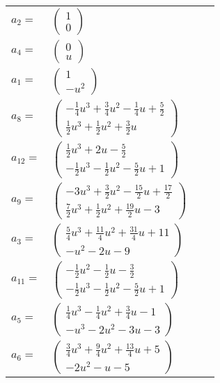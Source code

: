 \documentclass[1p]{elsarticle_modified}
\theoremstyle{definition}
\begin{document}
\begin{tabular}{m{7pt} m{180pt} m{7pt} m{180pt} }
\flushright $a_{2}=$&$\begin{pmatrix}1\\0\end{pmatrix}$ \\
\flushright $a_{4}=$&$\begin{pmatrix}0\\u\end{pmatrix}$ \\
\flushright $a_{1}=$&$\begin{pmatrix}1\\- u^2\end{pmatrix}$ \\
\flushright $a_{8}=$&$\begin{pmatrix}-\frac{1}{4} u^3+\frac{3}{4} u^2-\frac{1}{4} u+\frac{5}{2}\\\frac{1}{2} u^3+\frac{1}{2} u^2+\frac{3}{2} u\end{pmatrix}$ \\
\flushright $a_{12}=$&$\begin{pmatrix}\frac{1}{2} u^3+2 u-\frac{5}{2}\\-\frac{1}{2} u^3-\frac{1}{2} u^2-\frac{5}{2} u+1\end{pmatrix}$ \\
\flushright $a_{9}=$&$\begin{pmatrix}-3 u^3+\frac{3}{2} u^2-\frac{15}{2} u+\frac{17}{2}\\\frac{7}{2} u^3+\frac{1}{2} u^2+\frac{19}{2} u-3\end{pmatrix}$ \\
\flushright $a_{3}=$&$\begin{pmatrix}\frac{5}{4} u^3+\frac{11}{4} u^2+\frac{31}{4} u+11\\- u^2-2 u-9\end{pmatrix}$ \\
\flushright $a_{11}=$&$\begin{pmatrix}-\frac{1}{2} u^2-\frac{1}{2} u-\frac{3}{2}\\-\frac{1}{2} u^3-\frac{1}{2} u^2-\frac{5}{2} u+1\end{pmatrix}$ \\
\flushright $a_{5}=$&$\begin{pmatrix}\frac{1}{4} u^3-\frac{1}{4} u^2+\frac{3}{4} u-1\\- u^3-2 u^2-3 u-3\end{pmatrix}$ \\
\flushright $a_{6}=$&$\begin{pmatrix}\frac{3}{4} u^3+\frac{9}{4} u^2+\frac{13}{4} u+5\\-2 u^2- u-5\end{pmatrix}$ \\

\end{tabular}
\end{document}
